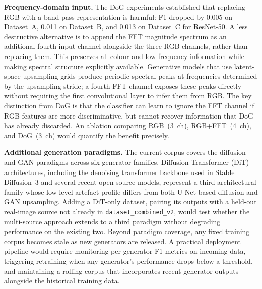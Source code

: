 \textbf{Frequency-domain input.} The DoG experiments established that replacing RGB with
a band-pass representation is harmful: F1 dropped by 0.005 on Dataset~A, 0.011 on
Dataset~B, and 0.013 on Dataset~C for ResNet-50. A less destructive alternative is to
append the FFT magnitude spectrum as an additional fourth input channel alongside the
three RGB channels, rather than replacing them. This preserves all colour and
low-frequency information while making spectral structure explicitly available. Generative
models that use latent-space upsampling grids produce periodic spectral peaks at
frequencies determined by the upsampling stride; a fourth FFT channel exposes these peaks
directly without requiring the first convolutional layer to infer them from RGB. The key
distinction from DoG is that the classifier can learn to ignore the FFT channel if RGB
features are more discriminative, but cannot recover information that DoG has already
discarded. An ablation comparing RGB~(3~ch), RGB+FFT~(4~ch), and DoG~(3~ch) would
quantify the benefit precisely.

\textbf{Additional generation paradigms.} The current corpus covers the diffusion and GAN
paradigms across six generator families. Diffusion Transformer (DiT) architectures,
including the denoising transformer backbone used in Stable Diffusion~3 and several
recent open-source models, represent a third architectural family whose low-level artefact
profile differs from both U-Net-based diffusion and GAN upsampling. Adding a DiT-only
dataset, pairing its outputs with a held-out real-image source not already in
\texttt{dataset\_combined\_v2}, would test whether the multi-source approach extends to
a third paradigm without degrading performance on the existing two. Beyond paradigm
coverage, any fixed training corpus becomes stale as new generators are released. A
practical deployment pipeline would require monitoring per-generator F1 metrics on
incoming data, triggering retraining when any generator's performance drops below a
threshold, and maintaining a rolling corpus that incorporates recent generator outputs
alongside the historical training data.
